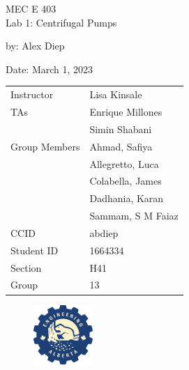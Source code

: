 \documentclass[letterpaper,12pt]{article} %
\begin{document}
\begin{titlepage}
    \centering
    \vspace*{2cm} %
    
    \Huge {MEC E 403 \\Lab 1: Centrifugal Pumps} \\
    \vspace{1cm} %
    
    \Large by: Alex Diep \\
    \vspace{1cm} %

    \Large Date: March 1, 2023 \\ %
    \vspace{2cm} %

    \begin{table}[h]
        \centering
        \begin{tabular}{ll}
            Instructor & Lisa Kinsale \\
            TAs & Enrique Millones \\
            & Simin Shabani \vspace{0.5cm} \\
            Group Members & Ahmad, Safiya \\
            & Allegretto, Luca \\
            & Colabella, James \\
            & Dadhania, Karan \\
            & Sammam, S M Faiaz \vspace{0.5cm} \\
            CCID & abdiep \\
            Student ID & 1664334 \\
            Section & H41 \\
            Group & 13 \\
        \end{tabular}
    \end{table}
    \begin{figure}[h]
        \centering
        \includegraphics[width=0.2\textwidth]{uofa_engineering_logo.png}
    \end{figure}
    \vfill %

    
\end{titlepage}
\renewcommand\arraystretch{1.5}
\end{document}
